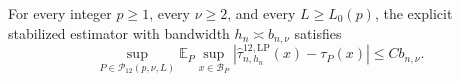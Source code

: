 For every integer \(p\geq1\), every \(\nu\geq2\), and every \(L\geq L_0(p)\), the explicit stabilized estimator with bandwidth \(h_n\asymp b_{n,\nu}\) satisfies
\[
 \sup_{P\in\mathcal P_{12}(p,\nu,L)}\mathbb E_P\sup_{x\in\mathcal B_P}|\widehat\tau^{12,\mathrm{LP}}_{n,h_n}(x)-\tau_P(x)|\leq Cb_{n,\nu}.
\]